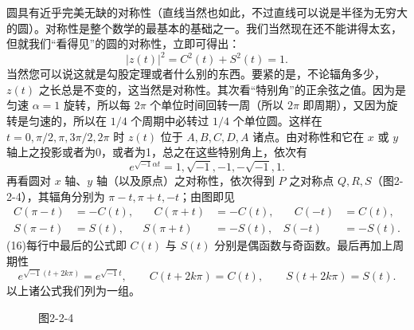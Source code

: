 圆具有近乎完美无缺的对称性（直线当然也如此，不过直线可以说是半径为无穷大的圆）。对称性是整个数学的最基本的基础之一。我们当然现在还不能讲得太玄，但就我们“看得见”的圆的对称性，立即可得出：
\[
|z(t)|^2=C^2(t)+S^2(t)=1.
\]
当然您可以说这就是勾股定理或者什么别的东西。要紧的是，不论辐角多少，$z(t)$ 之长总是不变的，这当然是对称性。其次看“特别角”的正余弦之值。因为是匀速 $\alpha=1$ 旋转，所以每 $2\pi$ 个单位时间回转一周（所以 $2\pi$ 即周期），又因为旋转是匀速的，所以在 $1/4$ 个周期中必转过 $1/4$ 个单位圆。这样在 $t=0,\pi/2,\pi,3\pi/2,2\pi$ 时 $z(t)$ 位于 $A,B,C,D,A$ 诸点。由对称性和它在 $x$ 或 $y$ 轴上之投影或者为0，或者为1，总之在这些特别角上，依次有
\[
e^{\sqrt{-1}\alpha t}=1,\sqrt{-1},-1,-\sqrt{-1},1.
\]
再看圆对 $x$ 轴、$y$ 轴（以及原点）之对称性，依次得到 $P$ 之对称点 $Q,R,S$（图2-2-4），其辐角分别为 $\pi-t,\pi+t,-t$；由图即见
\[
\begin{aligned}
C(\pi-t)&=-C(t),&\quad C(\pi+t)&=-C(t),&\quad C(-t)&=C(t),\\
S(\pi-t)&=S(t),& S(\pi+t)&=-S(t),& S(-t)&=-S(t).
\end{aligned}\tag{16}
\]
(16)每行中最后的公式即 $C(t)$ 与 $S(t)$ 分别是偶函数与奇函数。最后再加上周期性
\[
e^{\sqrt{-1}(t+2k\pi)}=e^{\sqrt{-1}t},\qquad C(t+2k\pi)=C(t),\qquad S(t+2k\pi)=S(t). \tag{17}
\]
以上诸公式我们列为一组。

\begin{figure}[htbp]
\centering
{}
\caption*{图2-2-4}
\end{figure}


